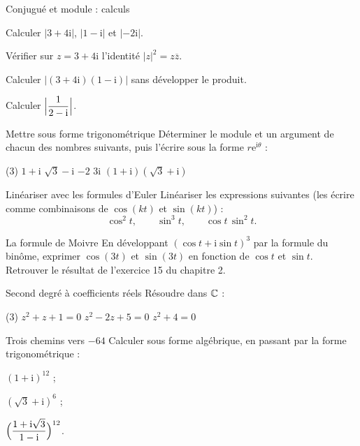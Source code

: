\begin{exercice}[1]{Conjugué et module : calculs}
\begin{questions}
  \item Calculer $|3+4\mathrm{i}|$, $|1-\mathrm{i}|$ et $|-2\mathrm{i}|$.
  \item Vérifier sur $z=3+4\mathrm{i}$ l'identité $|z|^{2}=z\overline{z}$.
  \item Calculer $|(3+4\mathrm{i})(1-\mathrm{i})|$ sans développer le produit.
  \item Calculer $\Bigl|\dfrac{1}{2-\mathrm{i}}\Bigr|$.
\end{questions}
\end{exercice}

\begin{exercice}[1]{Mettre sous forme trigonométrique}
Déterminer le module et un argument de chacun des nombres suivants, puis
l'écrire sous la forme $r\mathrm{e}^{\mathrm{i}\theta}$ :
\begin{tasks}(3)
  \task $1+\mathrm{i}$
  \task $\sqrt3-\mathrm{i}$
  \task $-2$
  \task $3\mathrm{i}$
  \task $(1+\mathrm{i})(\sqrt3+\mathrm{i})$
\end{tasks}
\end{exercice}

\begin{exercice}[1]{Linéariser avec les formules d'Euler}
Linéariser les expressions suivantes (les écrire comme combinaisons de
$\cos(kt)$ et $\sin(kt)$) :
\[
  \cos^{2}t,\qquad \sin^{3}t,\qquad \cos t\,\sin^{2}t.
\]
\end{exercice}

\begin{exercice}[1]{La formule de Moivre}
En développant $(\cos t+\mathrm{i}\sin t)^{3}$ par la formule du binôme,
exprimer $\cos(3t)$ et $\sin(3t)$ en fonction de $\cos t$ et $\sin t$.
Retrouver le résultat de l'exercice 15 du chapitre 2.
\end{exercice}

\begin{exercice}[1]{Second degré à coefficients réels}
Résoudre dans $\mathbb{C}$ :
\begin{tasks}(3)
  \task $z^{2}+z+1=0$
  \task $z^{2}-2z+5=0$
  \task $z^{2}+4=0$
\end{tasks}
\end{exercice}

\begin{exercice}[1]{Trois chemins vers $-64$}
Calculer sous forme algébrique, en passant par la forme trigonométrique :
\begin{questions}
  \item $(1+\mathrm{i})^{12}$ ;
  \item $(\sqrt3+\mathrm{i})^{6}$ ;
  \item $\Bigl(\dfrac{1+\mathrm{i}\sqrt3}{1-\mathrm{i}}\Bigr)^{12}$.
\end{questions}
\end{exercice}

